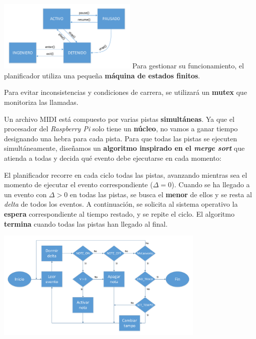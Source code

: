 \documentclass[10pt,a4paper]{article}
\begin{document}
	\begin{multicols}{2}
		\noindent
		\includegraphics[width=0.5\textwidth]{images/estados} 
		\columnbreak
		Para gestionar su funcionamiento, el planificador utiliza una pequeña \textbf{máquina de estados finitos}.
		
		Para evitar inconsistencias y condiciones de carrera, se utilizará un \textbf{mutex} que monitoriza las llamadas.
	\end{multicols}
	
	Un archivo MIDI está compuesto por varias pistas \textbf{simultáneas}. Ya que el procesador del \textit{Raspberry Pi} solo tiene un \textbf{núcleo}, no vamos a ganar tiempo designando una hebra para cada pista. Para que todas las pistas se ejecuten simultáneamente, diseñamos un \textbf{algoritmo inspirado en el \textit{merge sort}} que atienda a todas y decida qué evento debe ejecutarse en cada momento:
	
	El planificador recorre en cada ciclo todas las pistas, avanzando mientras sea el momento de ejecutar el evento correspondiente ($\Delta=0$). Cuando se ha llegado a un evento con $\Delta > 0$ en todas las pistas, se busca el \textbf{menor} de ellos y se resta al \textit{delta} de todos los eventos. A continuación, se solicita al sistema operativo la \textbf{espera} correspondiente al tiempo restado, y se repite el ciclo. El algoritmo \textbf{termina} cuando todas las pistas han llegado al final.
	
	\begin{center}
		\includegraphics[width=0.75\textwidth]{images/flujo_planificacion} 
	\end{center}
	
\end{document}
